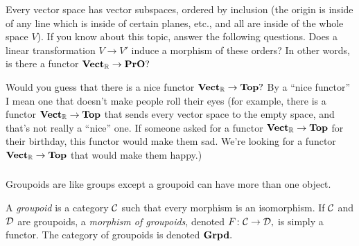\documentclass[../main/CT4S-EN-RU]{subfiles}
\begin{document}
\begin{exampleRUS}
\end{exampleRUS}

\begin{exerciseENG}
Every vector space has vector subspaces, ordered by inclusion (the origin is inside of any line which is inside of certain planes, etc., and all are inside of the whole space $V$). If you know about this topic, answer the following questions.
\sexc Does a linear transformation $V\to V'$ induce a morphism of these orders? In other words, is there a functor ${\mathbf{Vect}}_{\mathbb R}\rightarrow{\mathbf{PrO}}?$
\item Would you guess that there is a nice functor ${\mathbf{Vect}}_{\mathbb R}\rightarrow{\mathbf{Top}}?$ By a “nice functor” I mean one that doesn't make people roll their eyes (for example, there is a functor ${\mathbf{Vect}}_{\mathbb R}\rightarrow{\mathbf{Top}}$ that sends every vector space to the empty space, and that's not really a “nice” one. If someone asked for a functor ${\mathbf{Vect}}_{\mathbb R}\rightarrow{\mathbf{Top}}$ for their birthday, this functor would make them sad. We're looking for a functor ${\mathbf{Vect}}_{\mathbb R}\rightarrow{\mathbf{Top}}$ that would make them happy.)
\endsexc
\end{exerciseENG}

\begin{exerciseRUS}
\end{exerciseRUS}


\subsubsection{}\label{sec:groupoid}

\begin{blockENG}
Groupoids are like groups except a groupoid can have more than one object. 
\end{blockENG}

\begin{blockRUS}
\end{blockRUS}

\begin{definitionENG}
A {\em groupoid} is a category $\mathcal{C}$ such that every morphism is an isomorphism. If $\mathcal{C}$ and $\mathcal{D}$ are groupoids, a {\em morphism of groupoids}, denoted $F\colon\mathcal{C}\rightarrow\mathcal{D},$ is simply a functor. The category of groupoids is denoted ${\mathbf{Grpd}}.$
\end{definitionENG}
\end{document}
